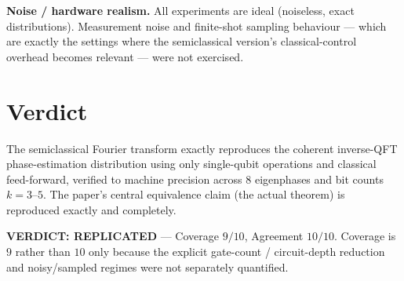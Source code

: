 \documentclass[11pt]{article}
\begin{document}
\textbf{Noise / hardware realism.} All experiments are ideal
(noiseless, exact distributions). Measurement noise and finite-shot
sampling behaviour --- which are exactly the settings where the
semiclassical version's classical-control overhead becomes relevant ---
were not exercised.

\section{Verdict}
The semiclassical Fourier transform exactly reproduces the coherent
inverse-QFT phase-estimation distribution using only single-qubit
operations and classical feed-forward, verified to machine precision
across 8 eigenphases and bit counts $k=3$--$5$. The paper's central
equivalence claim (the actual theorem) is reproduced exactly and
completely.

\textbf{VERDICT: REPLICATED} --- Coverage $9/10$, Agreement $10/10$.
Coverage is $9$ rather than $10$ only because the explicit gate-count /
circuit-depth reduction and noisy/sampled regimes were not separately
quantified.


\end{document}
